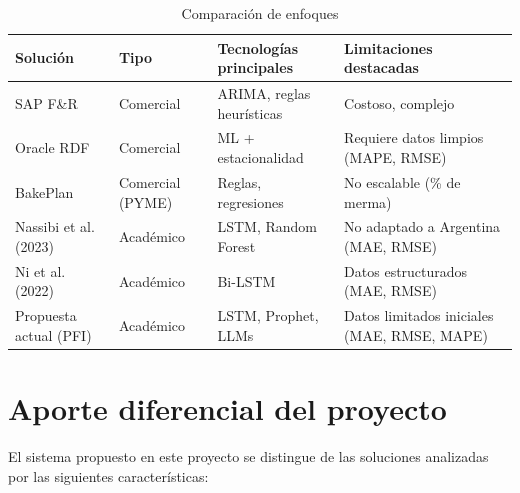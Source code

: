 \begin{table}[t]
    \centering
    \renewcommand{\arraystretch}{1.3}
    \caption{Comparación de enfoques}
    \label{tab:comparacion}
    \begin{tabular}{|p{2.9cm}|p{2cm}|p{3cm}|p{5cm}|}
        \hline
        \textbf{Solución} & \textbf{Tipo} & \textbf{Tecnologías principales} & \textbf{Limitaciones destacadas} \\
        \hline
        SAP F\&R & Comercial & ARIMA, reglas heurísticas & Costoso, complejo \\
        \hline
        Oracle RDF & Comercial & ML + estacionalidad & Requiere datos limpios (MAPE, RMSE) \\
        \hline
        BakePlan & Comercial (PYME) & Reglas, regresiones & No escalable (\% de merma) \\
        \hline
        Nassibi et al. (2023) & Académico & LSTM, Random Forest & No adaptado a Argentina (MAE, RMSE) \\
        \hline
        Ni et al. (2022) & Académico & Bi-LSTM & Datos estructurados (MAE, RMSE) \\
        \hline
        Propuesta actual (PFI) & Académico & LSTM, Prophet, LLMs & Datos limitados iniciales (MAE, RMSE, MAPE) \\
        \hline
    \end{tabular}
\end{table}


\section{Aporte diferencial del proyecto}

El sistema propuesto en este proyecto se distingue de las soluciones analizadas por las siguientes características:

